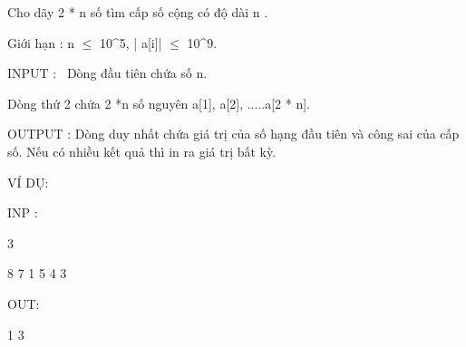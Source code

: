 



   Cho dãy 2 * n số tìm cấp số cộng có độ dài n .  

   Giới hạn : n  $\le$  10^5, | a[i]|  $\le$  10^9.  

   INPUT :  Dòng đầu tiên chứa số n.  

   Dòng thứ 2 chứa 2 *n số nguyên a[1], a[2], .....a[2 * n].  

   OUTPUT : Dòng duy nhất chứa giá trị của số hạng đầu tiên và công sai của cấp số. Nếu có nhiều kết quả thì in ra giá trị bất kỳ.  

   VÍ DỤ:  

   INP :  

   3  

   8 7 1 5 4 3  

   OUT:  

   1 3  
